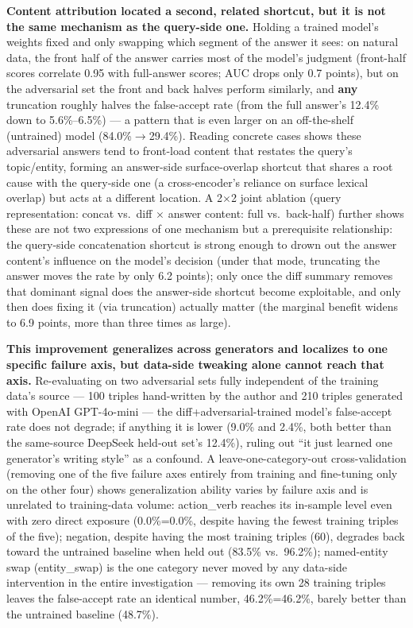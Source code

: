 \documentclass[11pt]{article}
\begin{document}
\textbf{Content attribution located a second, related shortcut, but it is not the same mechanism as the query-side one.} Holding a trained model's weights fixed and only swapping which segment of the answer it sees: on natural data, the front half of the answer carries most of the model's judgment (front-half scores correlate 0.95 with full-answer scores; AUC drops only 0.7 points), but on the adversarial set the front and back halves perform similarly, and \textbf{any} truncation roughly halves the false-accept rate (from the full answer's 12.4\% down to 5.6\%--6.5\%) --- a pattern that is even larger on an off-the-shelf (untrained) model (84.0\%$\to$29.4\%). Reading concrete cases shows these adversarial answers tend to front-load content that restates the query's topic/entity, forming an answer-side surface-overlap shortcut that shares a root cause with the query-side one (a cross-encoder's reliance on surface lexical overlap) but acts at a different location. A 2$\times$2 joint ablation (query representation: concat vs.\ diff $\times$ answer content: full vs.\ back-half) further shows these are not two expressions of one mechanism but a prerequisite relationship: the query-side concatenation shortcut is strong enough to drown out the answer content's influence on the model's decision (under that mode, truncating the answer moves the rate by only 6.2 points); only once the diff summary removes that dominant signal does the answer-side shortcut become exploitable, and only then does fixing it (via truncation) actually matter (the marginal benefit widens to 6.9 points, more than three times as large).

\textbf{This improvement generalizes across generators and localizes to one specific failure axis, but data-side tweaking alone cannot reach that axis.} Re-evaluating on two adversarial sets fully independent of the training data's source --- 100 triples hand-written by the author and 210 triples generated with OpenAI GPT-4o-mini --- the diff+adversarial-trained model's false-accept rate does not degrade; if anything it is lower (9.0\% and 2.4\%, both better than the same-source DeepSeek held-out set's 12.4\%), ruling out ``it just learned one generator's writing style'' as a confound. A leave-one-category-out cross-validation (removing one of the five failure axes entirely from training and fine-tuning only on the other four) shows generalization ability varies by failure axis and is unrelated to training-data volume: action\_verb reaches its in-sample level even with zero direct exposure (0.0\%=0.0\%, despite having the fewest training triples of the five); negation, despite having the most training triples (60), degrades back toward the untrained baseline when held out (83.5\% vs.\ 96.2\%); named-entity swap (entity\_swap) is the one category never moved by any data-side intervention in the entire investigation --- removing its own 28 training triples leaves the false-accept rate an identical number, 46.2\%=46.2\%, barely better than the untrained baseline (48.7\%).
\end{document}
